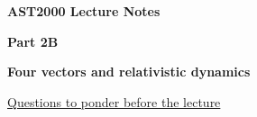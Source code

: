




\vspace*{2cm}

{\centerline{\bf\huge AST2000 Lecture Notes}}

\vspace*{1cm}

\newcommand{\PartName}{2B}
\newcommand{\refproblem}[1]{\PartName.\ref{#1}}


{\centerline{\bf\LARGE Part \PartName}}\vspace*{0.25cm}
{\centerline{\bf\LARGE Four vectors and relativistic dynamics}}

\vspace*{1cm}

{\centerline{\underline{\LARGE Questions to ponder before the lecture}}}

\vspace*{1cm}

